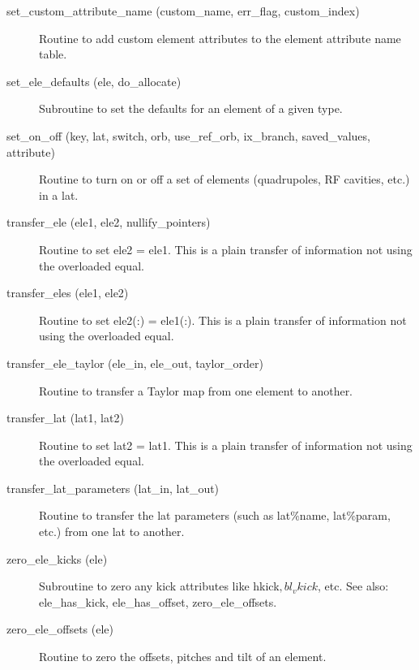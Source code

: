 \begin{description}
\label{r:set.custom.attribute.name}
\item[set_custom_attribute_name (custom_name, err_flag, custom_index)] \Newline 
Routine to add custom element attributes to the element attribute name table.

\label{r:set.ele.defaults}
\item[set_ele_defaults (ele, do_allocate)] \Newline 
Subroutine to set the defaults for an element of a given type.

\label{r:set.on.off}
\item[set_on_off (key, lat, switch, orb, use_ref_orb, ix_branch, saved_values, attribute)] \Newline
Routine to turn on or off a set of elements (quadrupoles,
RF cavities, etc.) in a lat.

\label{r:transfer.ele}
\item[transfer_ele (ele1, ele2, nullify_pointers)] \Newline 
     Routine to set ele2 = ele1. 
     This is a plain transfer of information not using the overloaded equal.

\label{r:transfer.eles}
\item[transfer_eles (ele1, ele2)] \Newline 
     Routine to set ele2(:) = ele1(:). 
     This is a plain transfer of information not using the overloaded equal.

\item[transfer_ele_taylor (ele_in, ele_out, taylor_order)] \Newline 
     Routine to transfer a Taylor map from one element to another.

\label{r:transfer.lat}
\item[transfer_lat (lat1, lat2)] \Newline 
     Routine to set lat2 = lat1. 
     This is a plain transfer of information not using the overloaded equal.

\label{r:transfer.lat.parameters}
\item[transfer_lat_parameters (lat_in, lat_out)] \Newline
Routine to transfer the lat parameters (such as lat\%name, 
lat\%param, etc.) from one lat to another. 


\label{r:zero.ele.kicks}
\item[zero_ele_kicks (ele)] \Newline 
Subroutine to zero any kick attributes like hkick$, bl_vkick$, etc.
See also: ele_has_kick, ele_has_offset, zero_ele_offsets.

\label{r:zero.ele.offsets}
\item[zero_ele_offsets (ele)] \Newline 
Routine to zero the offsets, pitches and tilt of an element.

\end{description}

